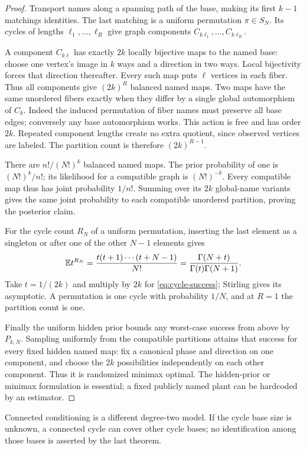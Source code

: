 \begin{proof}
Transport names along a spanning path of the base, making its first
$k-1$ matchings identities. The last matching is a uniform permutation
$\pi\in S_N$. Its cycles of lengths $\ell_1,\ldots,\ell_R$ give graph
components $C_{k\ell_1},\ldots,C_{k\ell_R}$.

A component $C_{k\ell}$ has exactly $2k$ locally bijective maps to
the named base: choose one vertex's image in $k$ ways and a direction
in two ways. Local bijectivity forces that direction thereafter.
Every such map puts $\ell$ vertices in each fiber. Thus all components
give $(2k)^R$ balanced named maps. Two maps have the same unordered
fibers exactly when they differ by a single global automorphism of
$C_k$. Indeed the induced permutation of fiber names must preserve all
base edges; conversely any base automorphism works. This action is
free and has order $2k$. Repeated component lengths create no extra
quotient, since observed vertices are labeled. The partition count is
therefore $(2k)^{R-1}$.

There are $n!/(N!)^k$ balanced named maps. The prior probability of one
is $(N!)^k/n!$; its likelihood for a compatible graph is $(N!)^{-k}$.
Every compatible map thus has joint probability $1/n!$. Summing over
its $2k$ global-name variants gives the same joint probability to each
compatible unordered partition, proving the posterior claim.

For the cycle count $R_N$ of a uniform permutation, inserting the last
element as a singleton or after one of the other $N-1$ elements gives
\[
 \mathbb E t^{R_N}=\frac{t(t+1)\cdots(t+N-1)}{N!}
 =\frac{\Gamma(N+t)}{\Gamma(t)\Gamma(N+1)}.
\]
Take $t=1/(2k)$ and multiply by $2k$ for \eqref{eq:cycle-success};
Stirling gives its asymptotic. A permutation is one cycle with
probability $1/N$, and at $R=1$ the partition count is one.

Finally the uniform hidden prior bounds any worst-case success from
above by $P_{k,N}$. Sampling uniformly from the compatible partitions
attains that success for every fixed hidden named map: fix a canonical
phase and direction on one component, and choose the $2k$ possibilities
independently on each other component. Thus it is randomized minimax
optimal. The hidden-prior or minimax formulation is essential; a fixed
publicly named plant can be hardcoded by an estimator.
\end{proof}

Connected conditioning is a different degree-two model. If the cycle
base size is unknown, a connected cycle can cover other cycle bases;
no identification among those bases is asserted by the last theorem.

